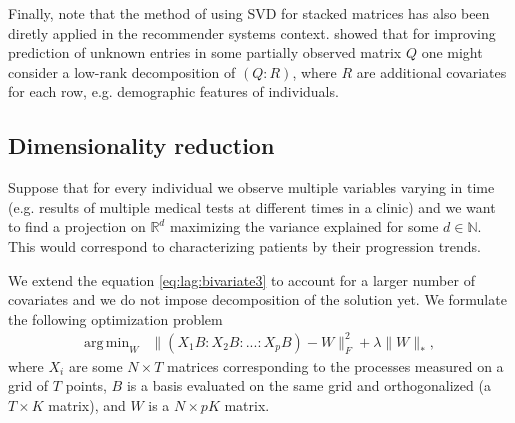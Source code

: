 \documentclass[preprint]{imsart}
\numberwithin{equation}{section}
\theoremstyle{plain}
\newcommand{\R}{\mathbb{R}}
\newcommand{\N}{\mathbb{N}}
\DeclareMathOperator*{\argmin}{arg\,min}
\begin{document}
Finally, note that the method of using SVD for stacked matrices has also been diretly applied in the recommender systems context. \citet{condli1999bayesian} showed that for improving prediction of unknown entries in some partially observed matrix $Q$ one might consider a low-rank decomposition of $(Q:R)$, where $R$ are additional covariates for each row, e.g. demographic features of individuals. %


\subsection{Dimensionality reduction}\label{ss:dim-red}

Suppose that for every individual we observe multiple variables varying in time (e.g. results of multiple medical tests at different times in a clinic) and we want to find a projection on $\R^d$ maximizing the variance explained for some $d \in \N$. This would correspond to characterizing patients by their progression trends.


We extend the equation \eqref{eq:lag:bivariate3} to account for a larger number of covariates and we do not impose decomposition of the solution yet. We formulate the following optimization problem
\begin{align*}%
  \argmin_{W} &\| (X_1B:X_2B:...:X_pB) - W \|_F^2 + \lambda\|W\|_*,
\end{align*}
where $X_i$ are some $N \times T$ matrices corresponding to the processes measured on a grid of $T$ points, $B$ is a basis evaluated on the same grid and orthogonalized (a $T \times K$ matrix), and $W$ is a $N \times pK$ matrix.
\end{document}
